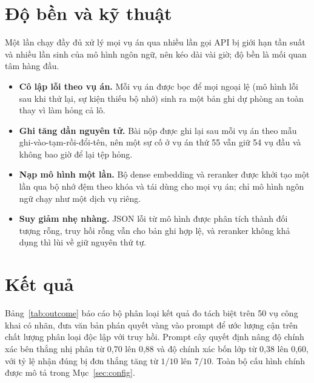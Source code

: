 \documentclass[conference]{IEEEtran}
\begin{document}
\section{Độ bền và kỹ thuật}
Một lần chạy đầy đủ xử lý mọi vụ án qua nhiều lần gọi API bị giới hạn tần suất và nhiều lần sinh của mô hình ngôn ngữ, nên kéo dài vài giờ; độ bền là mối quan tâm hàng đầu.
\begin{itemize}
  \item \textbf{Cô lập lỗi theo vụ án.} Mỗi vụ án được bọc để mọi ngoại lệ (mô hình lỗi sau khi thử lại, sự kiện thiếu bộ nhớ) sinh ra một bản ghi dự phòng an toàn thay vì làm hỏng cả lô.
  \item \textbf{Ghi tăng dần nguyên tử.} Bài nộp được ghi lại sau mỗi vụ án theo mẫu ghi-vào-tạm-rồi-đổi-tên, nên một sự cố ở vụ án thứ 55 vẫn giữ 54 vụ đầu và không bao giờ để lại tệp hỏng.
  \item \textbf{Nạp mô hình một lần.} Bộ dense embedding và reranker được khởi tạo một lần qua bộ nhớ đệm theo khóa và tái dùng cho mọi vụ án; chỉ mô hình ngôn ngữ chạy như một dịch vụ riêng.
  \item \textbf{Suy giảm nhẹ nhàng.} JSON lỗi từ mô hình được phân tích thành đối tượng rỗng, truy hồi rỗng vẫn cho bản ghi hợp lệ, và reranker không khả dụng thì lùi về giữ nguyên thứ tự.
\end{itemize}

\section{Kết quả}
Bảng~\ref{tab:outcome} báo cáo bộ phân loại kết quả đo tách biệt trên 50 vụ công khai có nhãn, đưa văn bản phán quyết vàng vào prompt để ước lượng cận trên chất lượng phân loại độc lập với truy hồi. Prompt cây quyết định nâng độ chính xác bên thắng nhị phân từ 0,70 lên 0,88 và độ chính xác bốn lớp từ 0,38 lên 0,60, với tỷ lệ nhận đúng bị đơn thắng tăng từ $1/10$ lên $7/10$. Toàn bộ cấu hình chính được mô tả trong Mục~\ref{sec:config}.

\begin{table}[t]
  \caption{Kết quả}
  \label{tab:outcome}
  \centering
\end{table}
\end{document}
